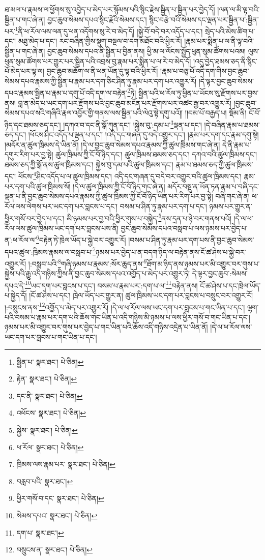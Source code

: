 ཐ་མལ་པ་རྣམས་ལ་ཕྱོགས་སུ་འབྱེད་པ་མེད་པར་སྙོམས་པའི་སྙིང་རྗེས་སྦྱིན་པ་སྦྱིན་པར་བྱེད་དོ། །ལན་ལ་མི་ལྟ་བའི་སྦྱིན་པ་གང་ཞེ་ན། བྱང་ཆུབ་སེམས་དཔའ་སྙིང་རྗེའི་སེམས་དང་། སྙིང་བརྩེ་བའི་སེམས་དང་ལྡན་པར་སྦྱིན་པ་:སྦྱིན་པར་\footnote{སྦྱིན་པ་  སྣར་ཐང་།  པེ་ཅིན། }ནི་ཕ་རོལ་ལས་ལན་དུ་ཕན་འདོགས་སུ་རེ་བ་མེད་དོ། །སྐྱེ་བོ་བདེ་བར་འདོད་པ་དང་། སྲེད་པའི་མེས་ཚིག་པ་དང་། མཐུ་མེད་པ་དང་། རང་བཞིན་གྱིས་སྡུག་བསྔལ་བ་དག་མཐོང་བའི་ཕྱིར་རོ། །རྣམ་པར་སྨིན་པ་ལ་ནི་ལྟ་བའི་སྦྱིན་པ་གང་ཞེ་ན། བྱང་ཆུབ་སེམས་དཔའ་ནི་སྦྱིན་པ་བྱིན་ནས། ཕྱི་མ་ལ་ལོངས་སྤྱོད་ཕུན་སུམ་ཚོགས་པའམ། ལུས་ཕུན་སུམ་ཚོགས་པར་གྱུར་པར་སྦྱིན་པའི་འབྲས་བུ་རྣམ་པར་སྨིན་པ་ལ་རེ་བ་མེད་དོ། །འདུ་བྱེད་ཐམས་ཅད་ནི་སྙིང་པོ་མེད་པར་ལྟ་ལ། བྱང་ཆུབ་མཆོག་ལ་ནི་ཕན་ཡོན་དུ་ལྟ་བའི་ཕྱིར་རོ། །རྣམ་པ་བཅུ་པོ་འདི་དག་གིས་བྱང་ཆུབ་སེམས་དཔའ་རྣམས་ཀྱི་སྦྱིན་པ་རྣམ་པར་དག་ཅིང་ཤིན་ཏུ་རྣམ་པར་དག་པར་འགྱུར་རོ། །དེ་ལྟར་བྱང་ཆུབ་སེམས་དཔའ་རྣམས་སྦྱིན་པ་རྣམ་པ་དགུ་པོ་འདི་དག་ལ་བརྟེན་\footnote{རྟེན་  སྣར་ཐང་།  པེ་ཅིན། }ཏེ། སྦྱིན་པའི་ཕ་རོལ་ཏུ་ཕྱིན་པ་ཡོངས་སུ་རྫོགས་པར་བྱས་ནས། བླ་ན་མེད་པ་ཡང་དག་པར་རྫོགས་པའི་བྱང་ཆུབ་མངོན་པར་རྫོགས་པར་འཚང་རྒྱ་བར་འགྱུར་རོ། །བྱང་ཆུབ་སེམས་དཔའ་སའི་གཞིའི་རྣལ་འབྱོར་གྱི་གནས་ལས་སྦྱིན་པའི་ལེའུ་སྟེ་དགུ་པའོ།། །།བམ་པོ་བརྒྱད་པ། སྡོམ་ནི། ངོ་བོ་ཉིད་དང་ཐམས་ཅད་དང་། །དཀའ་བ་དང་ནི་སྒོ་ཀུན་དང་། །སྐྱེས་བུ་:དམ་པ་\footnote{དང་ནི་  སྣར་ཐང་།  པེ་ཅིན། }ལྡན་པ་དང་། །དེ་བཞིན་རྣམ་པ་ཐམས་ཅད་དང་། །ཕོངས་ཤིང་འདོད་པ་ལྡན་པ་དང་། །འདི་དང་གཞན་དུ་བདེ་འགྱུར་དང་། །རྣམ་པར་དག་དང་རྣམ་དགུ་སྟེ། །མདོར་ན་ཚུལ་ཁྲིམས་དེ་ཡིན་ནོ། །དེ་ལ་བྱང་ཆུབ་སེམས་དཔའ་རྣམས་ཀྱི་ཚུལ་ཁྲིམས་གང་ཞེ་ན། དེ་ནི་རྣམ་པ་དགུར་རིག་པར་བྱ་སྟེ། ཚུལ་ཁྲིམས་ཀྱི་ངོ་བོ་ཉིད་དང་། ཚུལ་ཁྲིམས་ཐམས་ཅད་དང་། དཀའ་བའི་ཚུལ་ཁྲིམས་དང་། ཐམས་ཅད་ཀྱི་སྒོ་ནས་ཚུལ་ཁྲིམས་དང་། སྐྱེས་བུ་དམ་པའི་ཚུལ་ཁྲིམས་དང་། རྣམ་པ་ཐམས་ཅད་ཀྱི་ཚུལ་ཁྲིམས་དང་། ཕོངས་\footnote{འཕོངས་  སྣར་ཐང་།  པེ་ཅིན། }ཤིང་འདོད་པ་ལ་ཚུལ་ཁྲིམས་དང་། འདི་དང་གཞན་དུ་བདེ་བར་འགྱུར་བའི་ཚུལ་ཁྲིམས་དང་། རྣམ་པར་དག་པའི་ཚུལ་ཁྲིམས་སོ། །དེ་ལ་ཚུལ་ཁྲིམས་ཀྱི་ངོ་བོ་ཉིད་གང་ཞེ་ན། མདོར་བསྡུ་ན་ཡོན་ཏན་རྣམ་པ་བཞི་དང་ལྡན་པ་ནི་བྱང་ཆུབ་སེམས་དཔའ་རྣམས་ཀྱི་ཚུལ་ཁྲིམས་ཀྱི་ངོ་བོ་ཉིད་ཡིན་པར་རིག་པར་བྱ་སྟེ། བཞི་གང་ཞེ་ན། ཕ་རོལ་ལས་ལེགས་པར་ཡང་དག་པར་བླངས་པ་དང་། བསམ་པ་ཤིན་ཏུ་རྣམ་པར་དག་པ་དང་། ཉམས་པར་གྱུར་ན་ཕྱིར་གསོ་བར་བྱེད་པ་དང་། མི་ཉམས་པར་བྱ་བའི་ཕྱིར་གུས་པ་བསྐྱེད་\footnote{སྐྱེས་  སྣར་ཐང་།  པེ་ཅིན། }ནས་དྲན་པ་ཉེ་བར་གནས་པའོ། །དེ་ལ་ཕ་རོལ་ལས་ཚུལ་ཁྲིམས་ཡང་དག་པར་བླངས་པས་ནི། བྱང་ཆུབ་སེམས་དཔའ་བསླབ་པ་ལས་ཉམས་པར་བྱེད་པ་ན་:ཕ་རོལ་ལ་\footnote{ཕ་རོལ་  སྣར་ཐང་།  པེ་ཅིན། }བརྟེན་ཏེ་ཁྲེལ་ཡོད་པ་སྐྱེ་བར་འགྱུར་རོ། །བསམ་པ་ཤིན་ཏུ་རྣམ་པར་དག་པས་ནི་བྱང་ཆུབ་སེམས་དཔའ་ཚུལ་:ཁྲིམས་རྣམས་ལ་བསླབ་པ་\footnote{ཁྲིམས་ལས་རྣམ་པར་  སྣར་ཐང་།  པེ་ཅིན། }ཉམས་པར་བྱེད་པ་ན་བདག་ཉིད་ལ་བརྟེན་ནས་ངོ་ཚ་ཤེས་པ་སྐྱེ་བར་འགྱུར་རོ། །:བསླབ་པའི་\footnote{བརླབ་པའི་  སྣར་ཐང་། }གཞི་ཉམས་པ་རྣམས་:སོར་ཆུད་ནས་\footnote{ཕྱིར་གསོ་བ་དང་  སྣར་ཐང་།  པེ་ཅིན། }ཐོག་མ་ཉིད་ནས་ཉམས་པར་མི་འགྱུར་བར་གུས་པ་སྐྱེས་པའི་རྒྱུ་འདི་གཉིས་ཀྱིས་ནི་བྱང་ཆུབ་སེམས་དཔའ་འགྱོད་པ་མེད་པར་འགྱུར་ཏེ། དེ་ལྟར་བྱང་ཆུབ་:སེམས་དཔའ་དེ་\footnote{སེམས་དཔའ་  སྣར་ཐང་།  པེ་ཅིན། }ཡང་དག་པར་བླངས་པ་དང་། བསམ་པ་རྣམ་པར་:དག་པ་ལ་\footnote{དག་པ་  སྣར་ཐང་། }བརྟེན་ནས། ངོ་ཚ་ཤེས་པ་དང་ཁྲེལ་ཡོད་པ་སྐྱེད་དོ། །ངོ་ཚ་ཤེས་པ་དང་། ཁྲེལ་ཡོད་པར་གྱུར་ན། ཚུལ་ཁྲིམས་ཡང་དག་པར་བླངས་པ་བསྲུང་བར་འགྱུར་རོ། །:བསྲུངས་ནས་\footnote{བསྲུངས་ན་  སྣར་ཐང་།  པེ་ཅིན། }འགྱོད་པ་མེད་པར་འགྱུར་རོ། །དེ་ལ་ཕ་རོལ་ལས་ཡང་དག་པར་བླངས་པ་གང་ཡིན་པ་དང་། ལྷག་པའི་བསམ་པ་རྣམ་པར་དག་པའི་ཆོས་གང་ཡིན་པ་འདི་གཉིས་མི་ཉམས་པ་ལས་ཕྱིར་གསོ་བ་གང་ཡིན་པ་དང་། ཉམས་པར་མི་འགྱུར་བར་གུས་པར་བྱེད་པ་གང་ཡིན་པའི་ཆོས་འདི་གཉིས་འདྲེན་པ་ཡིན་ནོ། །དེ་ལ་ཕ་རོལ་ལས་ཡང་དག་པར་བླངས་པ་གང་ཡིན་པ་དང་། 